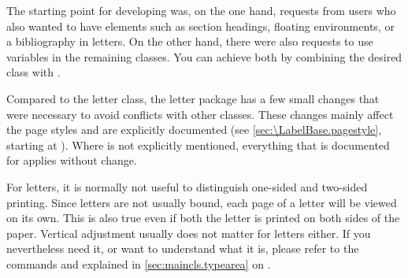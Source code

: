The starting point for developing  was, on the one hand,
requests from users who also wanted to have elements such as
section headings, floating
environments, or a bibliography in letters. On the other hand, there were also
requests to use  variables in the remaining \KOMAScript{}
classes. You can achieve both by combining the desired \KOMAScript{} class
with .

Compared to the letter class, the letter package has a few small changes that
were necessary to avoid conflicts with other classes. These changes mainly
affect the page styles and are explicitly documented (see
\autoref{sec:\LabelBase.pagestyle}, starting at
). Where  is not
explicitly mentioned, everything that is documented for 
applies without change.





For letters, it is normally not useful to distinguish one-sided and two-sided
printing. Since letters are not usually bound, each page of a letter will be
viewed on its own. This is also true even if both the letter is printed on
both sides of the paper. Vertical adjustment usually does not matter for
letters either. If you nevertheless need it, or want to understand what it is,
please refer to the commands
 and
 explained in
\autoref{sec:maincls.typearea} on .%
%
\EndIndexGroup



